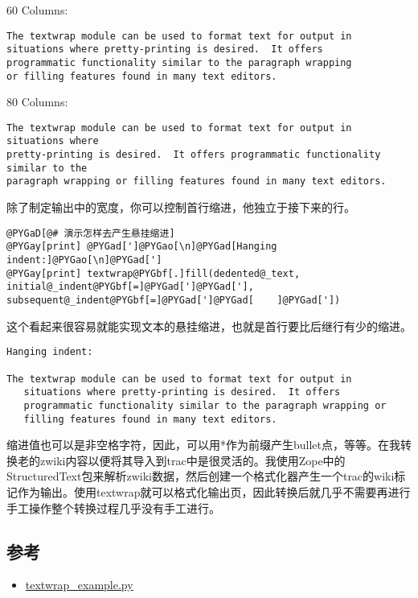 \documentclass[letterpaper,10pt,english]{manual}
\begin{document}
60 Columns:

\begin{Verbatim}[commandchars=@\[\]]
The textwrap module can be used to format text for output in
situations where pretty-printing is desired.  It offers
programmatic functionality similar to the paragraph wrapping
or filling features found in many text editors.
\end{Verbatim}

80 Columns:

\begin{Verbatim}[commandchars=@\[\]]
The textwrap module can be used to format text for output in situations where
pretty-printing is desired.  It offers programmatic functionality similar to the
paragraph wrapping or filling features found in many text editors.
\end{Verbatim}

除了制定输出中的宽度，你可以控制首行缩进，他独立于接下来的行。

\begin{Verbatim}[commandchars=@\[\]]
@PYGaD[@# 演示怎样去产生悬挂缩进]
@PYGay[print] @PYGad[']@PYGao[\n]@PYGad[Hanging indent:]@PYGao[\n]@PYGad[']
@PYGay[print] textwrap@PYGbf[.]fill(dedented@_text, initial@_indent@PYGbf[=]@PYGad[']@PYGad['], subsequent@_indent@PYGbf[=]@PYGad[']@PYGad[    ]@PYGad['])
\end{Verbatim}

这个看起来很容易就能实现文本的悬挂缩进，也就是首行要比后继行有少的缩进。

\begin{Verbatim}[commandchars=@\[\]]
Hanging indent:

The textwrap module can be used to format text for output in
   situations where pretty-printing is desired.  It offers
   programmatic functionality similar to the paragraph wrapping or
   filling features found in many text editors.
\end{Verbatim}

缩进值也可以是非空格字符，因此，可以用*作为前缀产生bullet点，等等。在我转换老的zwiki内容以便将其导入到trac中是很灵活的。我使用Zope中的StructuredText包来解析zwiki数据，然后创建一个格式化器产生一个trac的wiki标记作为输出。使用textwrap就可以格式化输出页，因此转换后就几乎不需要再进行手工操作整个转换过程几乎没有手工进行。


\subsection{参考}
\begin{itemize}
\item {} 
\href{http://www.doughellmann.com/PyMOTW/textwrap\_example.py}{textwrap\_example.py}

\end{itemize}
\end{document}
